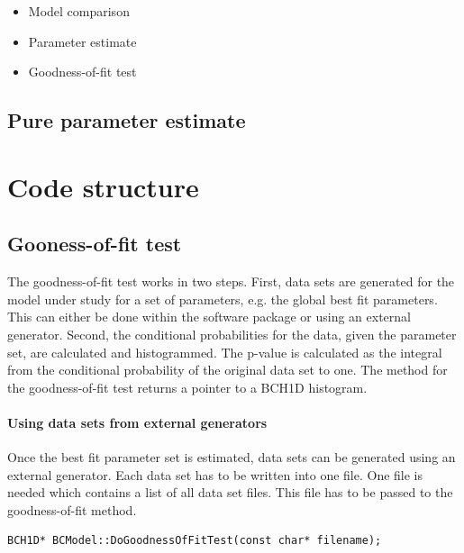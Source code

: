\documentclass[11pt, a4paper]{article}
\begin{document}
\begin{itemize} 
\item Model comparison 
\item Parameter estimate 
\item Goodness-of-fit test 
\end{itemize}

\subsection{Pure parameter estimate} 


\section{Code structure}

\subsection{Gooness-of-fit test} 

The goodness-of-fit test works in two steps. First, data sets are
generated for the model under study for a set of parameters, e.g. the
global best fit parameters. This can either be done within the
software package or using an external generator. Second, the
conditional probabilities for the data, given the parameter set, are
calculated and histogrammed. The p-value is calculated as the integral
from the conditional probability of the original data set to one. The
method for the goodness-of-fit test returns a pointer to a BCH1D
histogram. \\

\paragraph{Using data sets from external generators} 

Once the best fit parameter set is estimated, data sets can be
generated using an external generator. Each data set has to be written
into one file. One file is needed which contains a list of all data
set files. This file has to be passed to the goodness-of-fit method. 

\begin{verbatim} 
BCH1D* BCModel::DoGoodnessOfFitTest(const char* filename); 
\end{verbatim} 
\end{document}
